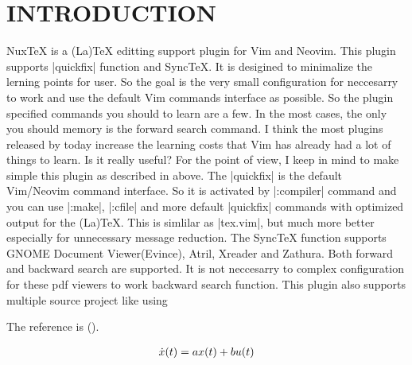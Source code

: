 \section{INTRODUCTION}

NuxTeX is a (La)TeX editting support plugin for Vim and Neovim. This plugin supports |quickfix| function and SyncTeX. It is desigined to minimalize the lerning points for user. So the goal is the very small configuration for neccesarry to work and use the default Vim commands interface as possible.  So the plugin specified commands you should to learn are a few. In the most cases, the only you should memory is the forward search command.
I think the most plugins released by today increase the learning costs that Vim has already had a lot of things to learn. Is it really useful? For the point of view, I keep in mind to make simple this plugin as described in above. The |quickfix| is the default Vim/Neovim command interface. So it is activated by |:compiler| command and you can use |:make|, |:cfile| and more default |quickfix| commands with optimized output for the (La)TeX. This is simlilar as |tex.vim|, but much more better especially for unnecessary message reduction.
The SyncTeX function supports GNOME Document Viewer(Evince), Atril, Xreader and Zathura. Both forward and backward search are supported. It is not neccesarry to complex configuration for these pdf viewers to work backward search function.
This plugin also supports multiple source project like using \

The reference is (\cite{ref1}).


\begin{eqnarray}
{\normalsize \dot{x}(t) = a x(t) + b u(t)}
\end{eqnarray}

